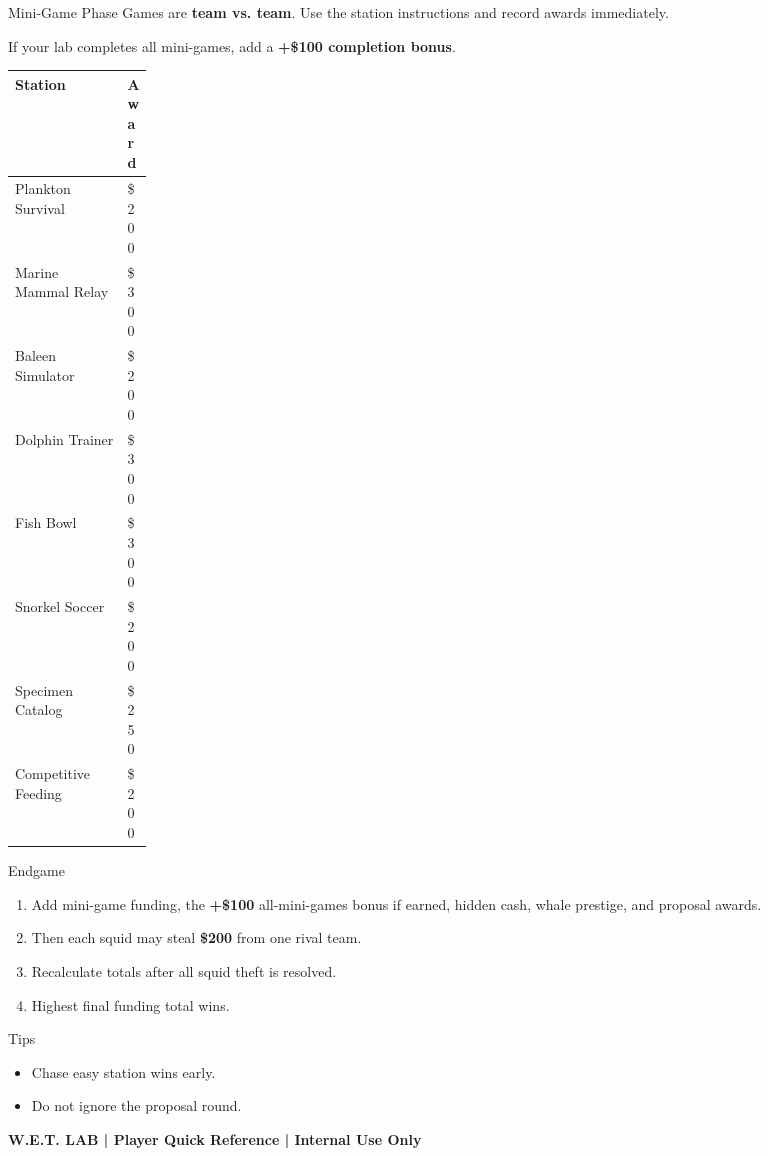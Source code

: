 \documentclass[12pt]{extarticle}
\begin{document}
\begin{minipage}[t]{0.492\textwidth}
\vspace{0pt}
\begin{labbox}{Mini-Game Phase}
Games are \textbf{team vs. team}. Use the station instructions and record awards immediately.

\vspace{2pt}
If your lab completes all mini-games, add a \textbf{+\$100 completion bonus}.

\vspace{2pt}
\begin{tabularx}{\linewidth}{@{}Y >{\raggedleft\arraybackslash}p{0.16\linewidth}@{}}
\toprule
Station & Award \\
\midrule
Plankton Survival & \$200 \\
Marine Mammal Relay & \$300 \\
Baleen Simulator & \$200 \\
Dolphin Trainer & \$300 \\
Fish Bowl & \$300 \\
Snorkel Soccer & \$200 \\
Specimen Catalog & \$250 \\
Competitive Feeding & \$200 \\
\bottomrule
\end{tabularx}
\end{labbox}

\begin{labbox}{Endgame}
\begin{enumerate}
\item Add mini-game funding, the \textbf{+\$100} all-mini-games bonus if earned, hidden cash, whale prestige, and proposal awards.
\item Then each squid may steal \textbf{\$200} from one rival team.
\item Recalculate totals after all squid theft is resolved.
\item Highest final funding total wins.
\end{enumerate}
\end{labbox}

\begin{labbox}{Tips}
\begin{itemize}
\item Chase easy station wins early.
\item Do not ignore the proposal round.
\end{itemize}
\end{labbox}

\end{minipage}

\vfill
\begin{center}
\footnotesize\color{agencyblue}\textbf{W.E.T. LAB | Player Quick Reference | Internal Use Only}
\end{center}
\end{document}
